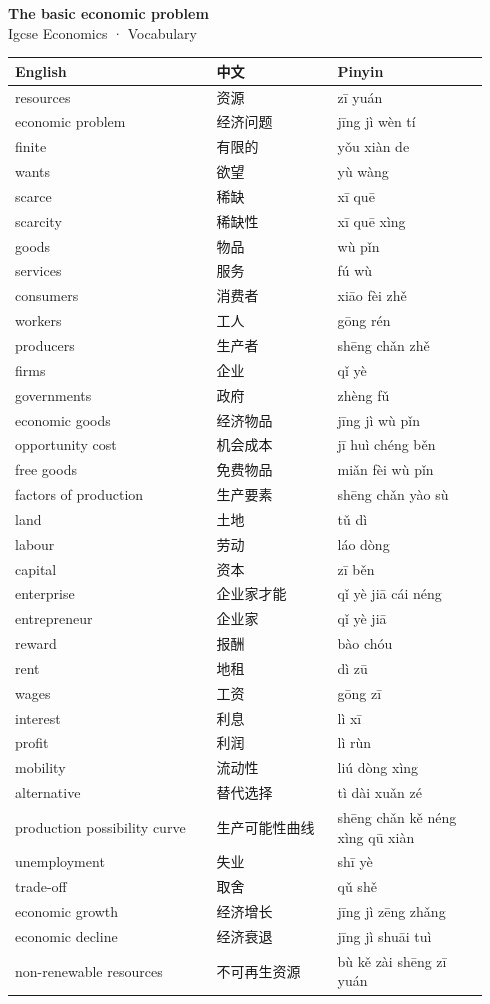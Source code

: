 \documentclass[11pt]{article}
\begin{document}
\begin{center}
  {\LARGE\bfseries The basic economic problem}\\[0.35em]
  {\large Igcse Economics · Vocabulary}
\end{center}
\vspace{0.6em}

\begin{longtable}{@{}p{0.40\linewidth}p{0.24\linewidth}p{0.30\linewidth}@{}}
\toprule
\textbf{English} & \textbf{中文} & \textbf{Pinyin} \\
\midrule
\endhead
\bottomrule
\endlastfoot
resources & 资源 & zī yuán \\
economic problem & 经济问题 & jīng jì wèn tí \\
finite & 有限的 & yǒu xiàn de \\
wants & 欲望 & yù wàng \\
scarce & 稀缺 & xī quē \\
scarcity & 稀缺性 & xī quē xìng \\
goods & 物品 & wù pǐn \\
services & 服务 & fú wù \\
consumers & 消费者 & xiāo fèi zhě \\
workers & 工人 & gōng rén \\
producers & 生产者 & shēng chǎn zhě \\
firms & 企业 & qǐ yè \\
governments & 政府 & zhèng fǔ \\
economic goods & 经济物品 & jīng jì wù pǐn \\
opportunity cost & 机会成本 & jī huì chéng běn \\
free goods & 免费物品 & miǎn fèi wù pǐn \\
factors of production & 生产要素 & shēng chǎn yào sù \\
land & 土地 & tǔ dì \\
labour & 劳动 & láo dòng \\
capital & 资本 & zī běn \\
enterprise & 企业家才能 & qǐ yè jiā cái néng \\
entrepreneur & 企业家 & qǐ yè jiā \\
reward & 报酬 & bào chóu \\
rent & 地租 & dì zū \\
wages & 工资 & gōng zī \\
interest & 利息 & lì xī \\
profit & 利润 & lì rùn \\
mobility & 流动性 & liú dòng xìng \\
alternative & 替代选择 & tì dài xuǎn zé \\
production possibility curve & 生产可能性曲线 & shēng chǎn kě néng xìng qū xiàn \\
unemployment & 失业 & shī yè \\
trade-off & 取舍 & qǔ shě \\
economic growth & 经济增长 & jīng jì zēng zhǎng \\
economic decline & 经济衰退 & jīng jì shuāi tuì \\
non-renewable resources & 不可再生资源 & bù kě zài shēng zī yuán \\
\end{longtable}
\end{document}
